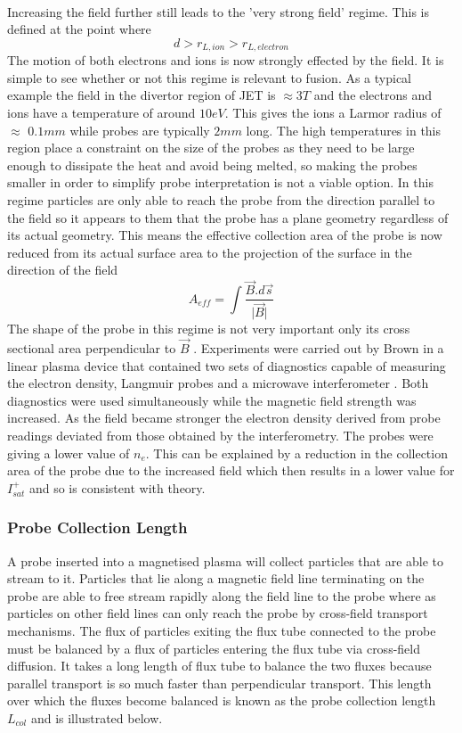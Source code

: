 \documentclass[12pt]{article}
\def\be{\begin{equation}}
\def\ee{\end{equation}}
\begin{document}
\paragraph{}
Increasing the field further still leads to the 'very strong field' regime. This is defined at the point where
\be
d > r_{L,ion} >  r_{L, electron}
\ee
The motion of both electrons and ions is now strongly effected by the field. It is simple to see whether or not this regime is relevant to fusion. As a typical example the field in the divertor region of JET is  $\approx 3T$ and the electrons and ions have a temperature of around $10eV$. This gives the ions a Larmor radius of $\approx$ $0.1mm$ while probes are typically $2mm$ long. The high temperatures in this region place a constraint on the size of the probes as they need to be large enough to dissipate the heat and avoid being melted, so making the probes smaller in order to simplify probe interpretation is not a viable option. 
In this regime particles are only able to reach the probe from the direction parallel to the field so it appears to them that the probe has a plane geometry regardless of its actual geometry. This means the effective collection area of the probe is now reduced from its actual surface area to the projection of the surface in the direction of the field 
\be 
A_{eff} = \int \frac{\vec{B} . d\vec{s}}{\lvert \vec{B} \rvert}
\ee 
The shape of the probe in this regime is not very important only its cross sectional area perpendicular to $\vec{B}$ \cite{te-determination}. Experiments were carried out by Brown in a linear plasma device that contained two sets of diagnostics capable of measuring the electron density, Langmuir probes and a microwave interferometer \cite{probe-response}. Both diagnostics were used simultaneously while the magnetic field strength was increased. As the field became stronger the electron density derived from probe readings deviated from those obtained by the interferometry. The probes were giving a lower value of $n_e$. This can be explained by a reduction in the collection area of the probe due to the increased field which then results in a lower value for $I_{sat}^+$ and so is consistent with theory.

\subsubsection{Probe Collection Length}
A probe inserted into a magnetised plasma will collect particles that are able to stream to it. Particles that lie along a magnetic field line terminating on the probe are able to free stream rapidly along the field line to the probe where as particles on other field lines can only reach the probe by cross-field transport mechanisms. The flux of particles exiting the flux tube connected to the probe must be balanced by a flux of particles entering the flux tube via cross-field diffusion. It takes a long length of flux tube to balance the two fluxes because parallel transport is so much faster than perpendicular transport. This length over which the fluxes become balanced is known as the probe collection length $L_{col}$ and is illustrated below.
\end{document}
